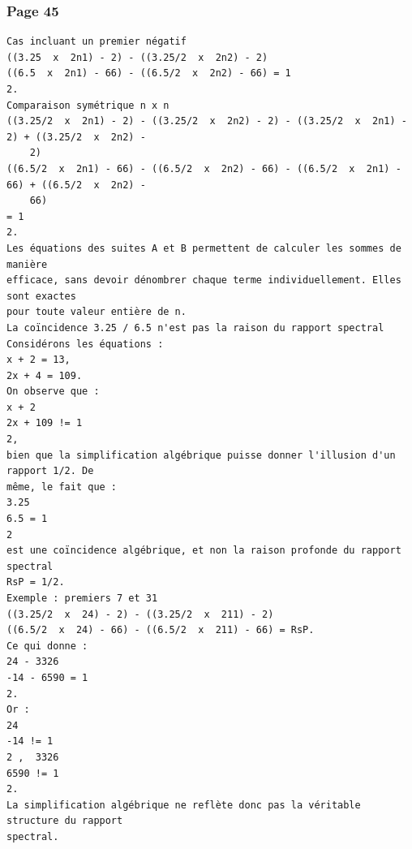 \documentclass[11pt,a4paper]{article}
\begin{document}
\subsubsection*{Page 45}
\begin{Verbatim}[fontsize=\footnotesize]
Cas incluant un premier négatif 
((3.25  x  2n1) - 2) - ((3.25/2  x  2n2) - 2)
((6.5  x  2n1) - 66) - ((6.5/2  x  2n2) - 66) = 1
2. 
Comparaison symétrique n x n 
((3.25/2  x  2n1) - 2) - ((3.25/2  x  2n2) - 2) - ((3.25/2  x  2n1) - 2) + ((3.25/2  x  2n2) -
    2)
((6.5/2  x  2n1) - 66) - ((6.5/2  x  2n2) - 66) - ((6.5/2  x  2n1) - 66) + ((6.5/2  x  2n2) -
    66)
= 1
2. 
Les équations des suites A et B permettent de calculer les sommes de manière
efficace, sans devoir dénombrer chaque terme individuellement. Elles sont exactes 
pour toute valeur entière de n. 
La coïncidence 3.25 / 6.5 n'est pas la raison du rapport spectral 
Considérons les équations : 
x + 2 = 13, 
2x + 4 = 109. 
On observe que : 
x + 2
2x + 109 != 1
2, 
bien que la simplification algébrique puisse donner l'illusion d'un rapport 1/2. De 
même, le fait que : 
3.25
6.5 = 1
2 
est une coïncidence algébrique, et non la raison profonde du rapport spectral 
RsP = 1/2. 
Exemple : premiers 7 et 31 
((3.25/2  x  24) - 2) - ((3.25/2  x  211) - 2)
((6.5/2  x  24) - 66) - ((6.5/2  x  211) - 66) = RsP. 
Ce qui donne : 
24 - 3326
-14 - 6590 = 1
2. 
Or : 
24
-14 != 1
2 ,  3326
6590 != 1
2. 
La simplification algébrique ne reflète donc pas la véritable structure du rapport 
spectral. 
\end{Verbatim}
\medskip
\clearpage
\end{document}

